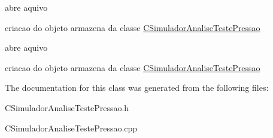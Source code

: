 abre aquivo

criacao do objeto armazena da classe \hyperlink{classCSimuladorAnaliseTestePressao}{C\-Simulador\-Analise\-Teste\-Pressao}

abre aquivo

criacao do objeto armazena da classe \hyperlink{classCSimuladorAnaliseTestePressao}{C\-Simulador\-Analise\-Teste\-Pressao} 

The documentation for this class was generated from the following files\-:\begin{DoxyCompactItemize}
\item 
C\-Simulador\-Analise\-Teste\-Pressao.\-h\item 
C\-Simulador\-Analise\-Teste\-Pressao.\-cpp\end{DoxyCompactItemize}
